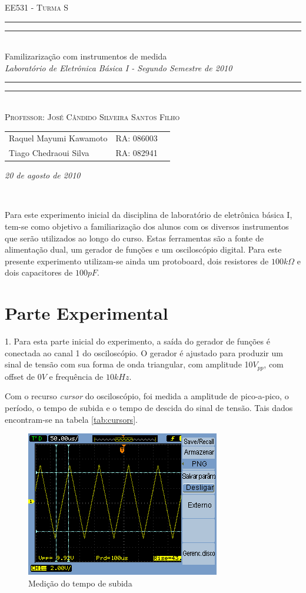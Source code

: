 \documentclass[a4paper]{article} %
\date{Agosto 20, 2010}
\newcommand*{\titleTMB}{\begingroup \centering \settowidth{\unitlength}{\LARGE EE531} {\large\scshape EE531 - Turma S}\\[0.2\baselineskip] \rule{11.0cm}{1.6pt}\vspace*{-\baselineskip}\vspace*{2pt} \rule{11.0cm}{0.4pt}\\[\baselineskip] {\LARGE  Familizarização com instrumentos de medida}\\\vspace*{\baselineskip}  {\itshape Laboratório de Eletrônica Básica I - Segundo Semestre de 2010}\\ \rule{11.0cm}{0.4pt}\vspace*{-\baselineskip}\vspace{3.2pt} \rule{11.0cm}{1.6pt}\\[\baselineskip] {\large\scshape Professor: José Cândido Silveira Santos Filho}\par \vfill {\normalsize   \scshape 
    \begin{center} 
      \begin{tabular}{  l  l  p{5cm} } 
        Raquel Mayumi Kawamoto & RA: 086003\\
        Tiago Chedraoui Silva  & RA: 082941\\
      \end{tabular} \end{center}
    \itshape 20 de agosto de 2010    }\\[\baselineskip] \vspace{3.2pt} \endgroup}
\begin{document}
\titleTMB 
\newpage



Para este experimento inicial da disciplina de laboratório de eletrônica básica I, tem-se como objetivo a familiarização dos alunos com os diversos instrumentos que serão utilizados ao longo do curso. Estas ferramentas são a fonte de alimentação dual, um gerador de funções e um osciloscópio digital. Para este presente experimento utilizam-se ainda um protoboard, dois resistores de 
$100k\Omega$ e dois capacitores de $100pF$. 
	

\section*{Parte Experimental}
1. Para esta parte inicial do experimento, a saída do gerador de funções é conectada ao canal 1 do osciloscópio. O gerador é ajustado para produzir um sinal de tensão com sua forma de onda triangular, com amplitude 10$V_{pp}$, com offset de $0V$ e frequência de $10kHz$. 
 
Com o recurso \textit{cursor} do osciloscópio, foi medida a amplitude de pico-a-pico, o período, o tempo de subida e o tempo de descida do sinal de tensão. Tais dados encontram-se na tabela \ref{tab:cursors}. 



\begin{figure}[h]
\begin{centering}
\includegraphics[scale=0.8]{Imagens/4122}\caption{Medição do tempo de subida \label{fig:Fig-4122}}
\par\end{centering}
\end{figure}
\end{document}
